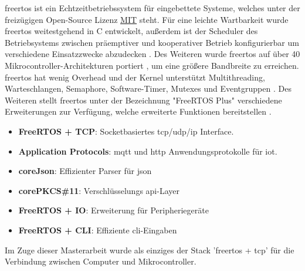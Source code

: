 \documentclass[../EDF Master Thesis.tex]{subfiles}
\begin{document}
\ac{freertos} ist ein Echtzeitbetriebssystem für eingebettete Systeme, welches unter der freizügigen Open-Source Lizenz \href{https://de.wikipedia.org/wiki/MIT-Lizenz}{MIT} steht.
Für eine leichte Wartbarkeit wurde \ac{freertos} weitestgehend in C entwickelt, außerdem ist der Scheduler des Betriebsystems zwischen präemptiver und kooperativer Betrieb konfigurierbar um verschiedene Einsatzzwecke abzudecken \parencite{wiki:002}.
Des Weiteren wurde \ac{freertos} auf über 40 Mikrocontroller-Architekturen portiert \parencite{freertos}, um eine größere Bandbreite zu erreichen.
\ac{freertos} hat wenig Overhead und der Kernel unterstützt Multithreading, Warteschlangen, Semaphore, Software-Timer, Mutexes und Eventgruppen \parencite{freertos-features}.
Des Weiteren stellt \ac{freertos} unter der Bezeichnung "FreeRTOS Plus" verschiedene Erweiterungen zur Verfügung, welche erweiterte Funktionen bereitstellen \parencite{freertos-extensions}.
\begin{itemize}
    \item \textbf{FreeRTOS + TCP}: Socketbasiertes \acs{tcp}/\acs{udp}/\acs{ip} Interface.
    \item \textbf{Application Protocols}: \acs{mqtt} und \acs{http} Anwendungsprotokolle für \acs{iot}.
    \item \textbf{coreJson}: Effizienter Parser für \acs{json}
    \item \textbf{corePKCS\#11}: Verschlüsselungs \acs{api}-Layer
    \item \textbf{FreeRTOS + IO}: Erweiterung für Peripheriegeräte
    \item \textbf{FreeRTOS + CLI}: Effiziente \acs{cli}-Eingaben
\end{itemize}

Im Zuge dieser Masterarbeit wurde als einziges der Stack '\ac{freertos} + \acs{tcp}' für die Verbindung zwischen Computer und Mikrocontroller.
\end{document}
